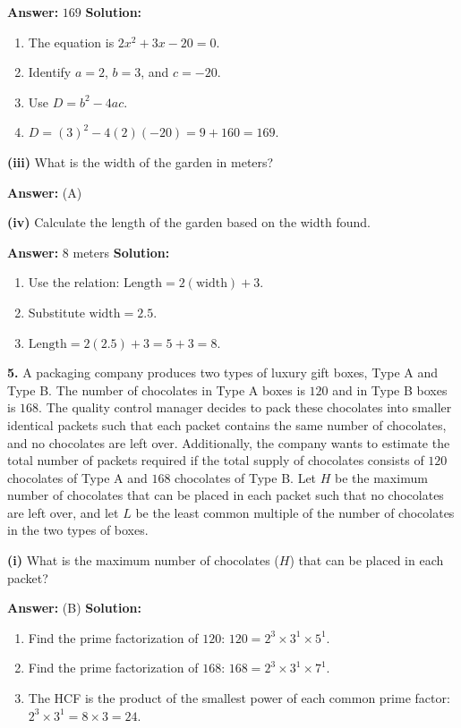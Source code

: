 \documentclass[12pt,a4paper]{exam}
\begin{document}
\begin{questions}
\textbf{Answer:} $169$
\textbf{Solution:}
\begin{enumerate}
  \item The equation is $2x^2 + 3x - 20 = 0$.
  \item Identify $a = 2$, $b = 3$, and $c = -20$.
  \item Use $D = b^2 - 4ac$.
  \item $D = (3)^2 - 4(2)(-20) = 9 + 160 = 169$.
\end{enumerate}

\textbf{(iii)} What is the width of the garden in meters?

\textbf{Answer:} (A)

\textbf{(iv)} Calculate the length of the garden based on the width found.

\textbf{Answer:} $8$ meters
\textbf{Solution:}
\begin{enumerate}
  \item Use the relation: $\text{Length} = 2(\text{width}) + 3$.
  \item Substitute $\text{width} = 2.5$.
  \item $\text{Length} = 2(2.5) + 3 = 5 + 3 = 8$.
\end{enumerate}

\vspace{0.3cm}

\question \textbf{5.} A packaging company produces two types of luxury gift boxes, Type A and Type B. The number of chocolates in Type A boxes is $120$ and in Type B boxes is $168$. The quality control manager decides to pack these chocolates into smaller identical packets such that each packet contains the same number of chocolates, and no chocolates are left over. Additionally, the company wants to estimate the total number of packets required if the total supply of chocolates consists of $120$ chocolates of Type A and $168$ chocolates of Type B. Let $H$ be the maximum number of chocolates that can be placed in each packet such that no chocolates are left over, and let $L$ be the least common multiple of the number of chocolates in the two types of boxes.

\textbf{(i)} What is the maximum number of chocolates ($H$) that can be placed in each packet?

\textbf{Answer:} (B)
\textbf{Solution:}
\begin{enumerate}
  \item Find the prime factorization of $120$: $120 = 2^3 \times 3^1 \times 5^1$.
  \item Find the prime factorization of $168$: $168 = 2^3 \times 3^1 \times 7^1$.
  \item The HCF is the product of the smallest power of each common prime factor: $2^3 \times 3^1 = 8 \times 3 = 24$.
\end{enumerate}


\end{questions}
\end{document}

